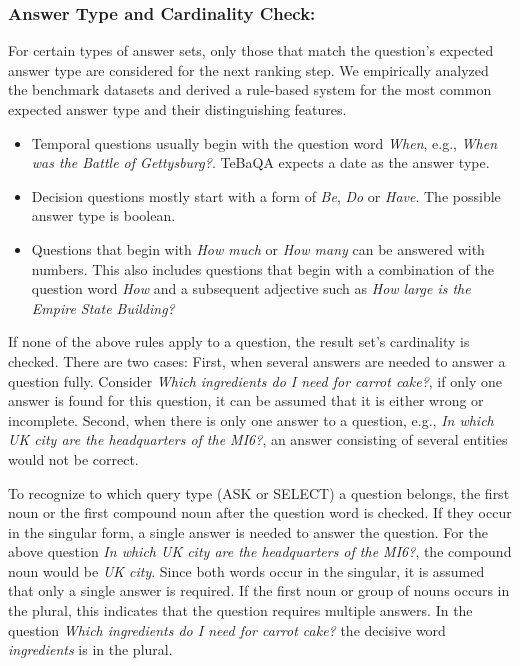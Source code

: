 \documentclass{IOS-Book-Article}
\begin{document}
\subsubsection{Answer Type and Cardinality Check:}
For certain types of answer sets, only those that match the question's expected answer type are considered for the next ranking step. 
We empirically analyzed the benchmark datasets and derived a rule-based system for the most common expected answer type and their distinguishing features. 
\begin{itemize}
    \item Temporal questions usually begin with the question word \textit{When}, e.g., \textit{When was the Battle of Gettysburg?}. TeBaQA expects a date as the answer type.
    \item Decision questions mostly start with a form of \textit{Be}, \textit{Do} or \textit{Have}. The possible answer type is boolean. 
    \item Questions that begin with \textit{How much} or \textit{How many} can be answered with numbers. This also includes questions that begin with a combination of the question word \textit{How} and a subsequent adjective such as \textit{How large is the Empire State Building?}
\end{itemize}
If none of the above rules apply to a question, the result set's cardinality is checked. There are two cases:
First, when several answers are needed to answer a question fully. Consider \textit{Which ingredients do I need for carrot cake?}, if only one answer is found for this question, it can be assumed that it is either wrong or incomplete. 
Second, when there is only one answer to a question, e.g., \textit{In which UK city are the headquarters of the MI6?}, an answer consisting of several entities would not be correct.

To recognize to which query type (ASK or SELECT) a question belongs, the first noun or the first compound noun after the question word is checked. 
If they occur in the singular form, a single answer is needed to answer the question. For the above question \textit{In which UK city are the headquarters of the MI6?}, the compound noun would be \textit{UK city}. Since both words occur in the singular, it is assumed that only a single answer is required. 
If the first noun or group of nouns occurs in the plural, this indicates that the question requires multiple answers. In the question \textit{Which ingredients do I need for carrot cake?} the decisive word \textit{ingredients} is in the plural.
\end{document}
